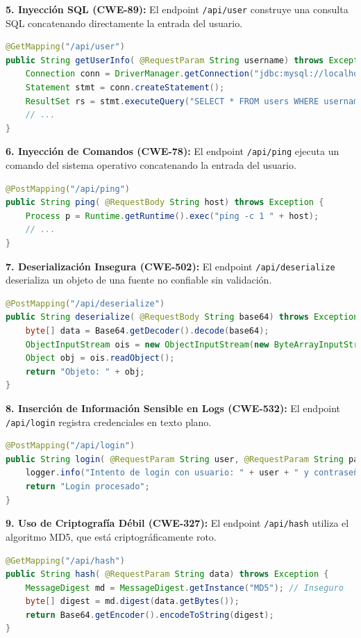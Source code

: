 \textbf{5. Inyección SQL (CWE-89):} El endpoint \texttt{/api/user} construye una consulta SQL concatenando directamente la entrada del usuario.
\begin{lstlisting}[language=java, caption={Código vulnerable a Inyección SQL.}]
@GetMapping("/api/user")
public String getUserInfo( @RequestParam String username) throws Exception {
    Connection conn = DriverManager.getConnection("jdbc:mysql://localhost:3306/demo", "root", DB_PASSWORD);
    Statement stmt = conn.createStatement();
    ResultSet rs = stmt.executeQuery("SELECT * FROM users WHERE username = '" + username + "'");
    // ...
}
\end{lstlisting}

\textbf{6. Inyección de Comandos (CWE-78):} El endpoint \texttt{/api/ping} ejecuta un comando del sistema operativo concatenando la entrada del usuario.
\begin{lstlisting}[language=java, caption={Código vulnerable a Inyección de Comandos.}]
@PostMapping("/api/ping")
public String ping( @RequestBody String host) throws Exception {
    Process p = Runtime.getRuntime().exec("ping -c 1 " + host);
    // ...
}
\end{lstlisting}

\textbf{7. Deserialización Insegura (CWE-502):} El endpoint \texttt{/api/deserialize} deserializa un objeto de una fuente no confiable sin validación.
\begin{lstlisting}[language=java, caption={Código vulnerable a Deserialización Insegura.}]
@PostMapping("/api/deserialize")
public String deserialize( @RequestBody String base64) throws Exception {
    byte[] data = Base64.getDecoder().decode(base64);
    ObjectInputStream ois = new ObjectInputStream(new ByteArrayInputStream(data));
    Object obj = ois.readObject();
    return "Objeto: " + obj;
}
\end{lstlisting}

\textbf{8. Inserción de Información Sensible en Logs (CWE-532):} El endpoint \texttt{/api/login} registra credenciales en texto plano.
\begin{lstlisting}[language=java, caption={Logs con información sensible.}]
@PostMapping("/api/login")
public String login( @RequestParam String user, @RequestParam String password) {
    logger.info("Intento de login con usuario: " + user + " y contraseña: " + password); // Log inseguro
    return "Login procesado";
}
\end{lstlisting}

\textbf{9. Uso de Criptografía Débil (CWE-327):} El endpoint \texttt{/api/hash} utiliza el algoritmo MD5, que está criptográficamente roto.
\begin{lstlisting}[language=java, caption={Uso de un algoritmo de hash débil (MD5).}]
@GetMapping("/api/hash")
public String hash( @RequestParam String data) throws Exception {
    MessageDigest md = MessageDigest.getInstance("MD5"); // Inseguro
    byte[] digest = md.digest(data.getBytes());
    return Base64.getEncoder().encodeToString(digest);
}
\end{lstlisting}


